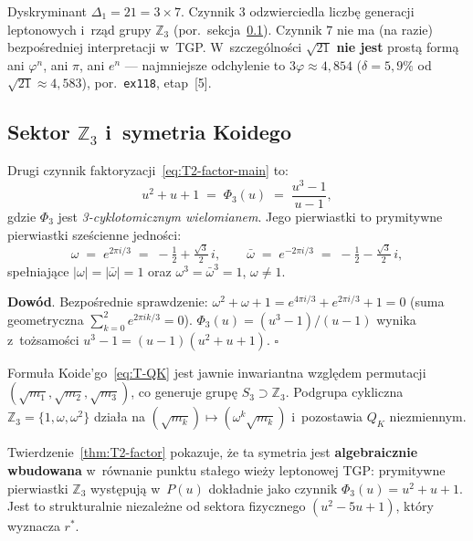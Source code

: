 \begin{remark}\label{rem:T2-21}
Dyskryminant $\Delta_1 = 21 = 3 \times 7$.
Czynnik $3$ odzwierciedla liczb\k{e} generacji leptonowych
i~rz\k{a}d grupy $\mathbb{Z}_3$ (por.\ sekcja~\ref{app:T2-Z3}).
Czynnik $7$ nie ma (na razie) bezpo\'sredniej interpretacji w~TGP.
W~szczeg\'olno\'sci $\sqrt{21}$ \textbf{nie jest} prost\k{a} form\k{a}
ani $\varphi^n$, ani $\pi$, ani $e^n$ ---
najmniejsze odchylenie to $3\varphi \approx 4{,}854$ ($\delta = 5{,}9\%$
od $\sqrt{21} \approx 4{,}583$), por.\ \texttt{ex118}, etap~[5].
\end{remark}


\subsection{Sektor $\mathbb{Z}_3$ i~symetria Koidego}\label{app:T2-Z3}

\begin{proposition}\label{prop:T2-cyclo}
Drugi czynnik faktoryzacji~\eqref{eq:T2-factor-main} to:
\begin{equation}
  u^2 + u + 1 \;=\; \Phi_3(u) \;=\; \frac{u^3 - 1}{u - 1},
\end{equation}
gdzie $\Phi_3$ jest \emph{3-cyklotomicznym wielomianem}.
Jego pierwiastki to prymitywne pierwiastki sze\'scienne jedno\'sci:
\begin{equation}\label{eq:T2-omega}
  \omega \;=\; e^{2\pi i/3} \;=\; -\tfrac{1}{2} + \tfrac{\sqrt{3}}{2}\,i,
  \qquad
  \bar\omega \;=\; e^{-2\pi i/3} \;=\; -\tfrac{1}{2} - \tfrac{\sqrt{3}}{2}\,i,
\end{equation}
spe\l{}niaj\k{a}ce $|\omega| = |\bar\omega| = 1$
oraz $\omega^3 = \bar\omega^3 = 1$, $\omega \neq 1$.

\textbf{Dow\'od}.
Bezpo\'srednie sprawdzenie: $\omega^2+\omega+1 = e^{4\pi i/3}+e^{2\pi i/3}+1 = 0$
(suma geometryczna $\sum_{k=0}^{2} e^{2\pi ik/3} = 0$).
$\Phi_3(u) = (u^3-1)/(u-1)$ wynika z~to\.zsamo\'sci
$u^3-1 = (u-1)(u^2+u+1)$.
\hfill$\square$
\end{proposition}

\begin{remark}\label{rem:T2-Z3-koide}
Formu\l{}a Koide'go~\eqref{eq:T-QK} jest jawnie inwariantna
wzgl\k{e}dem permutacji $(\sqrt{m_1}, \sqrt{m_2}, \sqrt{m_3})$,
co generuje grup\k{e} $S_3 \supset \mathbb{Z}_3$.
Podgrupa cykliczna $\mathbb{Z}_3 = \{1, \omega, \omega^2\}$
dzia\l{}a na $(\sqrt{m_k}) \mapsto (\omega^k \sqrt{m_k})$
i~pozostawia $Q_K$ niezmiennym.

Twierdzenie~\ref{thm:T2-factor} pokazuje, \.ze ta symetria jest
\textbf{algebraicznie wbudowana} w~r\'ownanie punktu sta\l{}ego
wie\.zy leptonowej TGP: prymitywne pierwiastki $\mathbb{Z}_3$
wyst\k{e}puj\k{a} w~$P(u)$ dok\l{}adnie jako czynnik $\Phi_3(u) = u^2+u+1$.
Jest to strukturalnie niezale\.zne od sektora fizycznego $(u^2-5u+1)$,
kt\'ory wyznacza $r^*$.
\end{remark}

